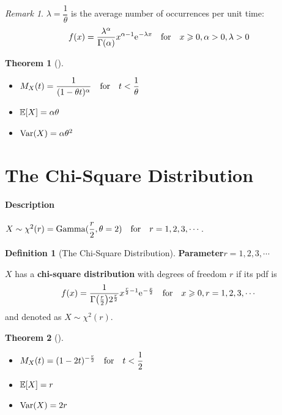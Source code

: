 \documentclass[10pt,UTF8]{article}
\newenvironment{definition box}
{\begin{tcolorbox}[colback=blue!5!white,colframe=blue!75!black,parbox=false,before upper=\par,before lower=\par]}
{\end{tcolorbox}}
\newenvironment{theorem box}
{\begin{tcolorbox}[colback=yellow!5!white,colframe=yellow!75!black,parbox=false,before upper=\par,before lower=\par]}
{\end{tcolorbox}}
\theoremstyle{definition}
\newtheorem{definition inner}{Definition}[section]
\newenvironment{definition}[1][]
{\begin{definition box}\begin{definition inner}[#1]\hfill\par}
{\end{definition inner}\end{definition box}}
\theoremstyle{plain}
\newtheorem{theorem inner}{Theorem}[section]
\newenvironment{theorem}[1][]
{\begin{theorem box}\begin{theorem inner}[#1]\hfill\par}
{\end{theorem inner}\end{theorem box}}
\theoremstyle{definition}
\newtheorem*{proof inner}{\textit{Proof}}
\theoremstyle{remark}
\newtheorem*{remark}{\textit{Remark}}
\newcommand{\e}{\mathrm{e}{\mkern 1 mu}}
\newcommand{\E}[1]{\mathbb{E}\qty[#1]}  %
\newcommand{\Var}[1]{\mathrm{Var}\qty(#1)}  %
\begin{document}
\begin{remark}
    $\lambda = \dfrac{1}{\theta}$ is the average number of occurrences per unit time:
    \begin{equation*}
        f(x)
        =\frac{\lambda^\alpha}{\Gamma(\alpha)}x^{\alpha-1}\e^{-\lambda x}
        \qfor x\geqslant 0, \alpha>0, \lambda>0
    \end{equation*}
\end{remark}

\begin{theorem}
    \begin{itemize}
        \item $\displaystyle M_X(t) = \frac{1}{(1-\theta t)^{\alpha}}
        \qfor t<\dfrac{1}{\theta}$
        \item $\E{X} = \alpha\theta$
        \item $\Var{X} = \alpha\theta^2$
    \end{itemize}
\end{theorem}

\section{The Chi-Square Distribution}

\paragraph{Description}
$X\sim\chi^2(r) = \mathrm{Gamma}(\dfrac{r}{2},\theta=2)\qfor r=1,2,3,\cdots$.

\begin{definition}[The Chi-Square Distribution]
    \textbf{Parameter}\qquad $r=1,2,3,\cdots$

    $X$ has a \textbf{chi-square distribution}
    with degrees of freedom $r$
    if its pdf is
    \begin{equation*}
        f(x) = 
        \frac{1}{\Gamma\qty(\frac{r}{2})2^{\frac{r}{2}}}x^{\frac{r}{2}-1}\e^{-\frac{x}{2}}
        \qfor x\geqslant 0, r=1,2,3,\cdots
    \end{equation*}
    and denoted as $X\sim\chi^2(r)$.
\end{definition}

\begin{theorem}
    \begin{itemize}
        \item $\displaystyle M_X(t) = (1-2t)^{-\frac{r}{2}}
        \qfor t<\frac{1}{2}$
        \item $\E{X} = r$
        \item $\Var{X} = 2r$
    \end{itemize}
\end{theorem}
\end{document}
